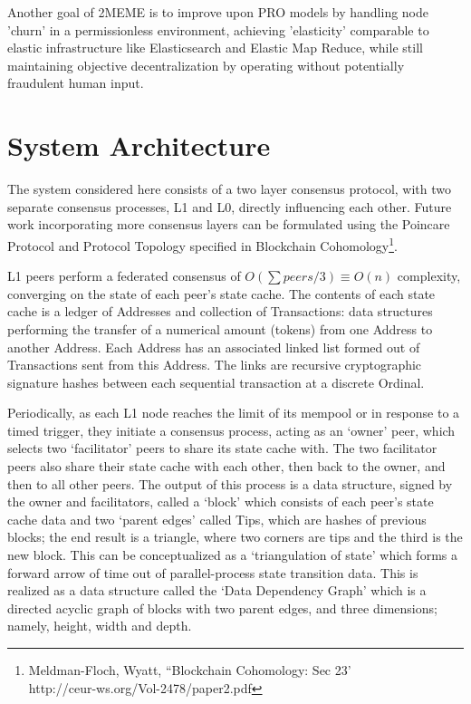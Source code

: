 \documentclass{article}
\begin{document}
Another goal of 2MEME is to improve upon PRO models by handling node 'churn' in a permissionless environment, achieving 'elasticity' comparable to elastic infrastructure like Elasticsearch and Elastic Map Reduce, while still maintaining objective decentralization by operating without potentially fraudulent human input.

\section{System Architecture}
The system considered here consists of a two layer consensus protocol, with two separate consensus processes, L1 and L0, directly influencing each other. Future work incorporating more consensus layers can be formulated using the Poincare Protocol and Protocol Topology specified in Blockchain Cohomology\footnote{Meldman-Floch, Wyatt, ``Blockchain Cohomology: Sec 23' \\ http://ceur-ws.org/Vol-2478/paper2.pdf}.

L1 peers perform a federated consensus of $O(\sum peers/3) \equiv O(n)$ complexity, converging on the state of each peer’s state cache. The contents of each state cache is a ledger of Addresses and collection of Transactions: data structures performing the transfer of a numerical amount (tokens) from one Address to another Address. Each Address has an associated linked list formed out of Transactions sent from this Address. The links are recursive cryptographic signature hashes between each sequential transaction at a discrete Ordinal.

Periodically, as each L1 node reaches the limit of its mempool or in response to a timed trigger, they initiate a consensus process, acting as an ‘owner’ peer, which selects two ‘facilitator’ peers to share its state cache with. The two facilitator peers also share their state cache with each other, then back to the owner, and then to all other peers. The output of this process is a data structure, signed by the owner and facilitators, called a ‘block’ which consists of each peer’s state cache data and two ‘parent edges’ called Tips, which are hashes of previous blocks; the end result is a triangle, where two corners are tips and the third is the new block. This can be conceptualized as a ‘triangulation of state’ which forms a forward arrow of time out of parallel-process state transition data. This is realized as a data structure called the ‘Data Dependency Graph’ which is a directed acyclic graph of blocks with two parent edges, and three dimensions; namely, height, width and depth. 
\end{document}

